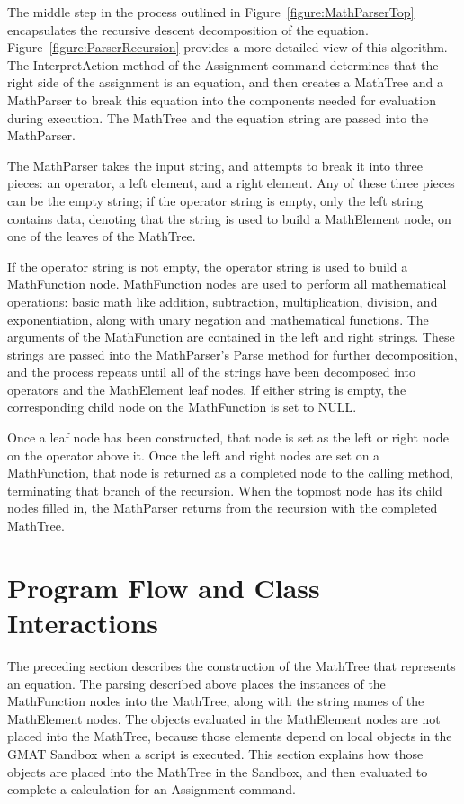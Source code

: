The middle step in the process outlined in Figure~\ref{figure:MathParserTop}
encapsulates the recursive descent decomposition of the equation.
Figure~\ref{figure:ParserRecursion} provides a more detailed view of this
algorithm.  The InterpretAction method of the Assignment command determines
that the right side of the assignment is an equation, and then creates a
MathTree and a MathParser to break this equation into the components needed for evaluation during
execution.  The MathTree and the equation string are passed
into the MathParser.

The MathParser takes the input string, and attempts to break it into three
pieces: an operator, a left element, and a right element.  Any of these three
pieces can be the empty string; if the operator string is empty, only the left
string contains data, denoting that the string is used to build a MathElement
node, on one of the leaves of the MathTree.

If the operator string is not empty, the operator string is used to build a
MathFunction node.  MathFunction nodes are used to perform all mathematical
operations: basic math like addition, subtraction, multiplication, division,
and exponentiation, along with unary negation and mathematical functions.  The
arguments of the MathFunction are contained in the left and right strings.
These strings are passed into the MathParser's Parse method for further
decomposition, and the process repeats until all of the strings have been
decomposed into operators and the MathElement leaf nodes.  If either string is
empty, the corresponding child node on the MathFunction is set to NULL.

Once a leaf node has been constructed, that node is set as the left or right
node on the operator above it.  Once the left and right nodes are set on a
MathFunction, that node is returned as a completed node to the calling method,
terminating that branch of the recursion.  When the topmost node has its child
nodes filled in, the MathParser returns from the recursion with the completed
MathTree.

\section{Program Flow and Class Interactions}

The preceding section describes the construction of the MathTree that
represents an equation. The parsing described above places the instances of the
MathFunction nodes into the MathTree, along with the string names of the
MathElement nodes.  The objects evaluated in the MathElement nodes are not
placed into the MathTree, because those elements depend on local objects in the
GMAT Sandbox when a script is executed.  This section explains how those
objects are placed into the MathTree in the Sandbox, and then evaluated to
complete a calculation for an Assignment command.

